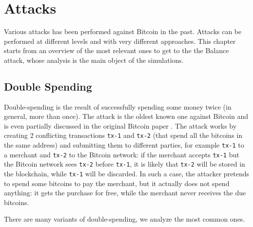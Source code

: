 \chapter{Attacks}
\label{chapter:attacks}
Various attacks has been performed against Bitcoin in the past.
Attacks can be performed at different levels and with very different approaches.
This chapter starts from an overview of the most relevant ones to get to the the Balance attack, whose analysis is the main object of the simulations.

\section{Double Spending}
Double-spending is the result of successfully spending some money twice (in general, more than once).
The attack is the oldest known one against Bitcoin and is even partially discussed in the original Bitcoin paper \cite{bitcoin_2009}.
The attack works by creating \num{2} conflicting transactions \texttt{tx-1} and \texttt{tx-2} (that spend all the bitcoins in the same address) and submitting them to different parties, for example \texttt{tx-1} to a merchant and \texttt{tx-2} to the Bitcoin network:
if the merchant accepts \texttt{tx-1} but the Bitcoin network sees \texttt{tx-2} before \texttt{tx-1}, it is likely that \texttt{tx-2} will be stored in the blockchain, while \texttt{tx-1} will be discarded.
In such a case, the attacker pretends to spend some bitcoins to pay the merchant, but it actually does not spend anything:
it gets the purchase for free, while the merchant never receives the due bitcoins.

There are many variants of double-spending, we analyze the most common ones.

